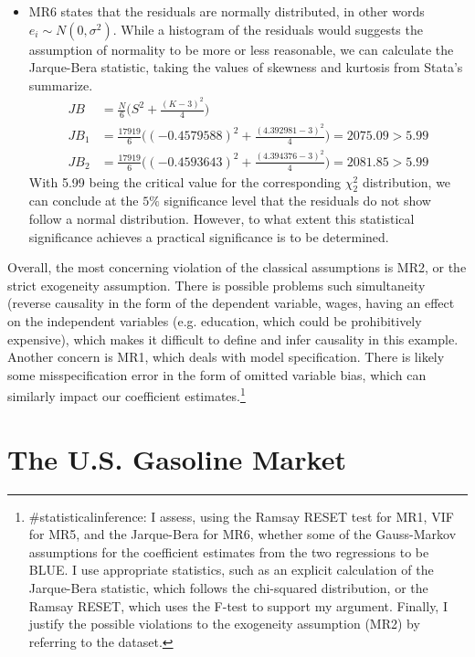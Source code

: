 \documentclass{article}
\begin{document}
\begin{enumerate}[label=\alph*.]
\begin{itemize}
	\item MR6 states that the residuals are normally distributed, in other words $e_i  \sim N(0, \sigma^2)$. While a histogram of the residuals would suggests the assumption of normality to be more or less reasonable, we can calculate the Jarque-Bera statistic, taking the values of skewness and kurtosis from Stata's summarize. 
\begin{align*}
JB &= \frac{N}{6}\Big(	 S^2 + \frac{(K-3)^2}{4} \Big)		\\
JB_1 &= \frac{17919}{6}\Big((-0.4579588)^2 + \frac{(4.392981-3)^2}{4} \Big) = 2075.09>5.99\\
JB_2 &= \frac{17919}{6}\Big((-0.4593643)^2 + \frac{(4.394376-3)^2}{4} \Big) = 2081.85>5.99
\end{align*}
With 5.99 being the critical value for the corresponding $\chi_2^2$ distribution, we can conclude at the $5\%$ significance level that the residuals do not show follow a normal distribution. However, to what extent this statistical significance achieves a practical significance is to be determined.
\end{itemize}
Overall, the most concerning violation of the classical assumptions is MR2, or the strict exogeneity assumption. There is possible problems such simultaneity (reverse causality in the form of the dependent variable, wages, having an effect on the independent variables (e.g. education, which could be prohibitively expensive), which makes it difficult to define and infer causality in this example. Another concern is MR1, which deals with model specification. There is likely some misspecification error in the form of omitted variable bias, which can similarly impact our coefficient estimates.\footnote{\#statisticalinference: I assess, using the Ramsay RESET test for MR1, VIF for MR5, and the Jarque-Bera for MR6, whether some of the Gauss-Markov assumptions for the coefficient estimates from the two regressions to be BLUE. I use appropriate statistics, such as an explicit calculation of the Jarque-Bera statistic, which follows the chi-squared distribution, or the Ramsay RESET, which uses the F-test to support my argument. Finally, I justify the possible violations to the exogeneity assumption (MR2) by referring to the dataset.}



\end{enumerate}

\newpage
\section{The U.S. Gasoline Market}
\end{document}
